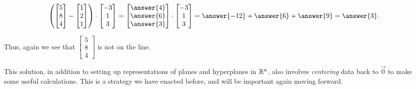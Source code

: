 \documentclass{ximera}
\begin{document}
\begin{solution}
  $$\left(\begin{bmatrix}
    5\\8\\4
  \end{bmatrix}-\begin{bmatrix}
    1\\2\\1
  \end{bmatrix}\right)\cdot \begin{bmatrix}
    -3\\1\\3
  \end{bmatrix}=\begin{bmatrix}
    \answer{4}\\\answer{6}\\\answer{3}
  \end{bmatrix}\cdot \begin{bmatrix}
    -3\\1\\3
  \end{bmatrix}=\answer{-12}+\answer{6}+\answer{9}=\answer{3}.$$

  Thus, again we see that $\begin{bmatrix}
    5\\8\\4
  \end{bmatrix}$ is not on the line.

  This solution, in addition to setting up representations of planes and hyperplanes in $\mathbb{R}^n$, also involves \emph{centering} data back to $\vec{0}$ to make some useful calculations. This is a strategy we have enacted before, and will be important again moving forward.


\end{solution}
\end{document}
